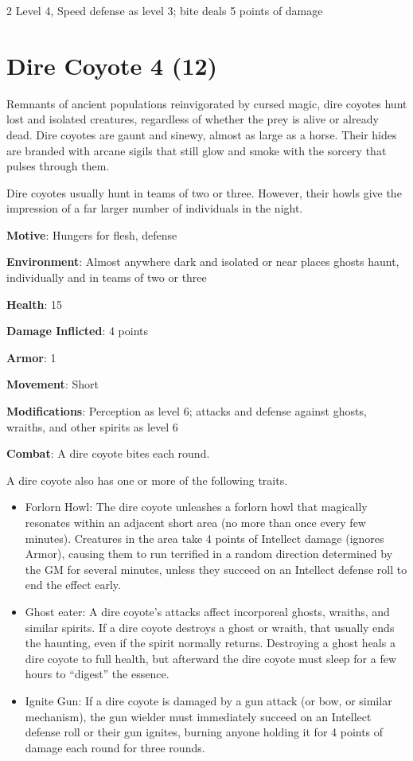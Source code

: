 \begin{multicols}{2}
Level 4, Speed defense as level 3; bite deals 5 points of damage

\section{Dire Coyote 4 (12)}

Remnants of ancient populations reinvigorated by cursed magic, dire coyotes hunt lost and isolated creatures, regardless of whether the prey is alive or already dead. Dire coyotes are gaunt and sinewy, almost as large as a horse. Their hides are branded with arcane sigils that still glow and smoke with the sorcery that pulses through them. 

Dire coyotes usually hunt in teams of two or three. However, their howls give the impression of a far larger number of individuals in the night.

\textbf{Motive}: Hungers for flesh, defense 

\textbf{Environment}: Almost anywhere dark and isolated or near places ghosts haunt, individually and in teams of two or three 

\textbf{Health}: 15 

\textbf{Damage Inflicted}: 4 points 

\textbf{Armor}: 1 

\textbf{Movement}: Short 

\textbf{Modifications}: Perception as level 6; attacks and defense against ghosts, wraiths, and other spirits as level 6 

\textbf{Combat}: A dire coyote bites each round. 

A dire coyote also has one or more of the following traits.

\begin{itemize}
\item	Forlorn Howl: The dire coyote unleashes a forlorn howl that magically resonates within an adjacent short area (no more than once every few minutes). Creatures in the area take 4 points of Intellect damage (ignores Armor), causing them to run terrified in a random direction determined by the GM for several minutes, unless they succeed on an Intellect defense roll to end the effect early.
\item	Ghost eater: A dire coyote’s attacks affect incorporeal ghosts, wraiths, and similar spirits. If a dire coyote destroys a ghost or wraith, that usually ends the haunting, even if the spirit normally returns. Destroying a ghost heals a dire coyote to full health, but afterward the dire coyote must sleep for a few hours to “digest” the essence. 
\item	Ignite Gun: If a dire coyote is damaged by a gun attack (or bow, or similar mechanism), the gun wielder must immediately succeed on an Intellect defense roll or their gun ignites, burning anyone holding it for 4 points of damage each round for three rounds. 
\end{itemize}


\end{multicols}
